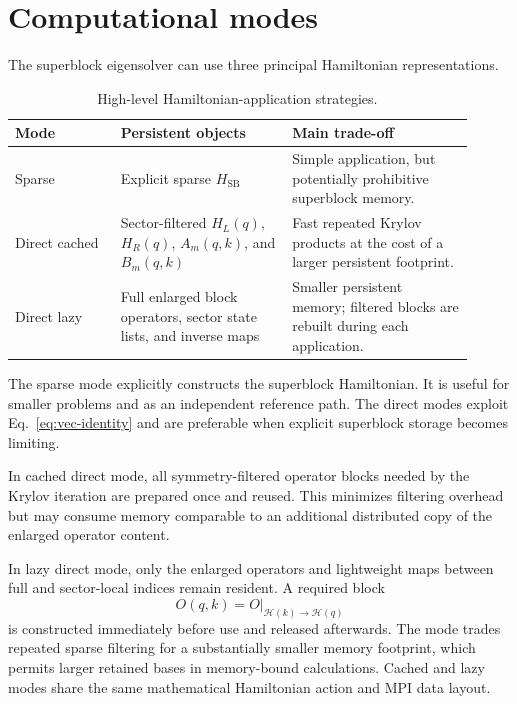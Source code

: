 \documentclass[11pt,a4paper]{article}
\newcommand{\Hil}{\mathcal H}
\begin{document}
\section{Computational modes}

The superblock eigensolver can use three principal Hamiltonian representations.

\begin{table}[ht]
  \centering
  \small
  \begin{tabular}{@{}p{0.21\linewidth}p{0.34\linewidth}p{0.36\linewidth}@{}}
    \toprule
    Mode & Persistent objects & Main trade-off \\
    \midrule
    Sparse
      & Explicit sparse $H_{\mathrm{SB}}$
      & Simple application, but potentially prohibitive superblock memory. \\
    Direct cached
      & Sector-filtered $H_L(q)$, $H_R(q)$, $A_m(q,k)$, and $B_m(q,k)$
      & Fast repeated Krylov products at the cost of a larger persistent footprint. \\
    Direct lazy
      & Full enlarged block operators, sector state lists, and inverse maps
      & Smaller persistent memory; filtered blocks are rebuilt during each application. \\
    \bottomrule
  \end{tabular}
  \caption{High-level Hamiltonian-application strategies.}
\end{table}

The sparse mode explicitly constructs the superblock Hamiltonian.  It is
useful for smaller problems and as an independent reference path.  The direct
modes exploit Eq.~\eqref{eq:vec-identity} and are preferable when explicit
superblock storage becomes limiting.

In cached direct mode, all symmetry-filtered operator blocks needed by the
Krylov iteration are prepared once and reused.  This minimizes filtering
overhead but may consume memory comparable to an additional distributed copy
of the enlarged operator content.

In lazy direct mode, only the enlarged operators and lightweight maps between
full and sector-local indices remain resident.  A required block
\begin{equation}
  O(q,k)=O\big|_{\Hil(k)\rightarrow\Hil(q)}
\end{equation}
is constructed immediately before use and released afterwards.  The mode
trades repeated sparse filtering for a substantially smaller memory footprint,
which permits larger retained bases in memory-bound calculations.  Cached and
lazy modes share the same mathematical Hamiltonian action and MPI data layout.
\end{document}
